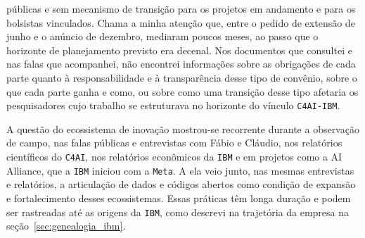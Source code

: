 públicas e sem mecanismo de transição para os projetos em andamento e para os bolsistas vinculados. Chama a minha atenção que, entre o pedido de extensão de junho e o anúncio de dezembro, mediaram poucos meses, ao passo que o horizonte de planejamento previsto era decenal. Nos documentos que consultei e nas falas que acompanhei, não encontrei informações sobre as obrigações de cada parte quanto à responsabilidade e à transparência desse tipo de convênio, sobre o que cada parte ganha e como, ou sobre como uma transição desse tipo afetaria os pesquisadores cujo trabalho se estruturava no horizonte do vínculo \texttt{C4AI-IBM}.

A questão do ecossistema de inovação mostrou-se recorrente durante a observação de campo, nas falas públicas e entrevistas com Fábio e Cláudio, nos relatórios científicos do \texttt{C4AI}, nos relatórios econômicos da \texttt{IBM} e em projetos como a AI Alliance, que a \texttt{IBM} iniciou com a \texttt{Meta}. A ela veio junto, nas mesmas entrevistas e relatórios, a articulação de dados e códigos abertos como condição de expansão e fortalecimento desses ecossistemas. Essas práticas têm longa duração e podem ser rastreadas até as origens da \texttt{IBM}, como descrevi na trajetória da empresa na seção~\ref{sec:genealogia_ibm}. %


